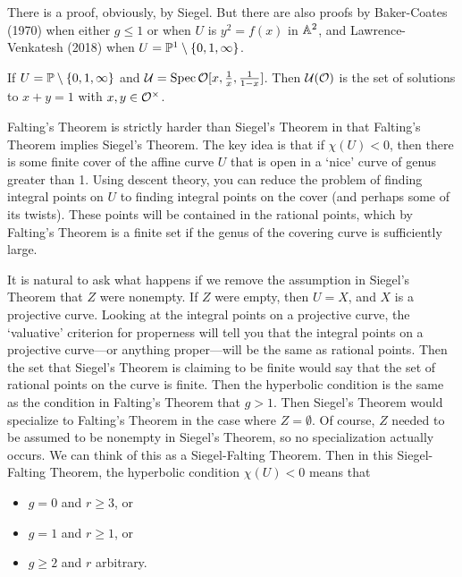 There is a proof, obviously, by Siegel. But there are also proofs by Baker-Coates (1970) when either $g \leq 1$ or when $U$ is $y^2= f(x)$ in $\A^2$, and Lawrence-Venkatesh (2018) when $U= \P^1 \setminus \{0,1,\infty\}$. 


\begin{ex}
If $U= \P \setminus \{0,1,\infty\}$ and $\cU= \spec \O[x, \frac{1}{x},\frac{1}{1-x}]$. Then $\cU(\O)$ is the set of solutions to $x+y=1$ with $x,y \in \O^\times$. 
\end{ex}


\begin{rem}
Falting's Theorem is strictly harder than Siegel's Theorem in that Falting's Theorem implies Siegel's Theorem. The key idea is that if $\chi(U)<0$, then there is some finite \etale cover of the affine curve $U$ that is open in a `nice' curve of genus greater than 1. Using descent theory, you can reduce the problem of finding integral points on $U$ to finding integral points on the cover (and perhaps some of its twists). These points will be contained in the rational points, which by Falting's Theorem is a finite set if the genus of the covering curve is sufficiently large. 
\end{rem}


It is natural to ask what happens if we remove the assumption in Siegel's Theorem that $Z$ were nonempty. If $Z$ were empty, then $U= X$, and $X$ is a projective curve. Looking at the integral points on a projective curve, the `valuative' criterion for properness will tell you that the integral points on a projective curve---or anything proper---will be the same as rational points. Then the set that Siegel's Theorem is claiming to be finite would say that the set of rational points on the curve is finite. Then the hyperbolic condition is the same as the condition in Falting's Theorem that $g>1$. Then Siegel's Theorem would specialize to Falting's Theorem in the case where $Z= \emptyset$. Of course, $Z$ needed to be assumed to be nonempty in Siegel's Theorem, so no specialization actually occurs. We can think of this as a Siegel-Falting Theorem. Then in this Siegel-Falting Theorem, the hyperbolic condition $\chi(U)<0$ means that 


\begin{itemize}
\item $g=0$ and $r \geq 3$, or
\item $g=1$ and $r \geq 1$, or
\item $g \geq 2$ and $r$ arbitrary.
\end{itemize}


